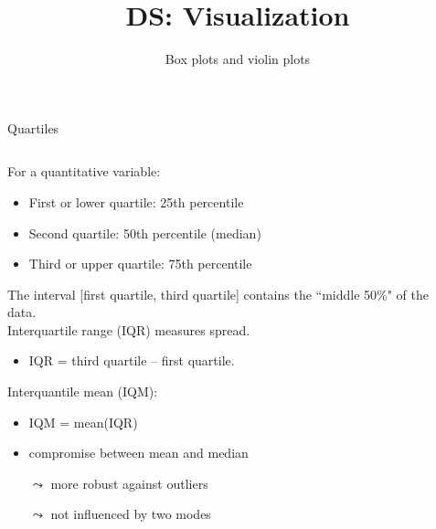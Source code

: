 \documentclass[aspectratio=169]{../latex_main/tntbeamer}  %
\title[Visualization]{DS: Visualization}
\subtitle{Box plots and violin plots}
\begin{document}
	
	\maketitle
	\begin{frame}{Quartiles}
	    \vspace{-2em}
	     \begin{columns}
            \begin{column}{.5\textwidth}
                For a quantitative variable:
                \begin{itemize}
                    \item First or lower quartile: 25th percentile
                    \item Second quartile: 50th percentile (median)
                    \item Third or upper quartile: 75th percentile
                \end{itemize}
                The interval [first quartile, third quartile] contains the “middle 50\%" of the data.\\
                \smallskip
                Interquartile range (IQR) measures spread.
                \begin{itemize}
                    \item IQR = third quartile – first quartile.
                \end{itemize}
                Interquantile mean (IQM):
                \begin{itemize}
                    \item IQM = mean(IQR)
                    \item compromise between mean and median
                    \item[$\leadsto$] more robust against outliers
                    \item[$\leadsto$] not influenced by two modes
                \end{itemize}

            \end{column}
            
            
            \begin{column}{.5\textwidth}


\end{column}
\end{columns}
\end{frame}
\end{document}
